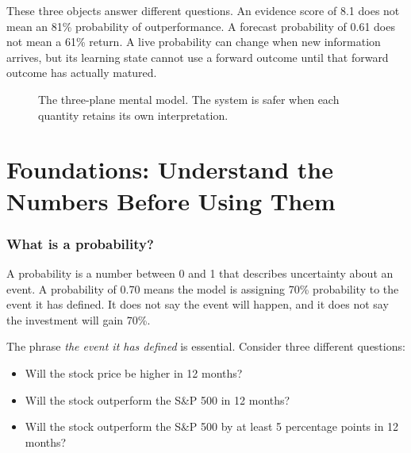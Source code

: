\documentclass[11pt]{article}
\begin{document}
These three objects answer different questions. An evidence score of 8.1 does not mean an 81\% probability of outperformance. A forecast probability of 0.61 does not mean a 61\% return. A live probability can change when new information arrives, but its learning state cannot use a forward outcome until that forward outcome has actually matured.

\begin{figure}[H]
\centering
{}
\caption{The three-plane mental model. The system is safer when each quantity retains its own interpretation.}
\end{figure}

\part{Foundations: Understand the Numbers Before Using Them}

\section{What is a probability?}

A probability is a number between 0 and 1 that describes uncertainty about an event. A probability of 0.70 means the model is assigning 70\% probability to the event it has defined. It does not say the event will happen, and it does not say the investment will gain 70\%.

The phrase \emph{the event it has defined} is essential. Consider three different questions:

\begin{itemize}
\item Will the stock price be higher in 12 months?
\item Will the stock outperform the S\&P 500 in 12 months?
\item Will the stock outperform the S\&P 500 by at least 5 percentage points in 12 months?
\end{itemize}
\end{document}
